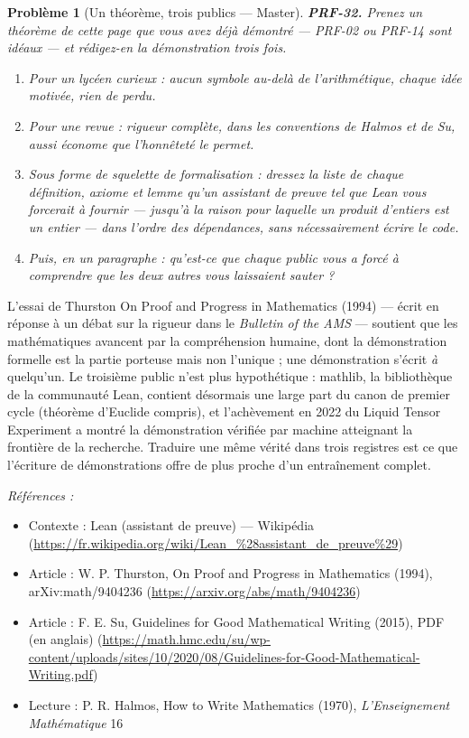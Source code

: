 \documentclass[11pt]{article}
\newtheorem{problem}{Problème}
\newenvironment{refs}{\par\small\noindent\emph{Références :}\begin{itemize}\setlength\itemsep{0pt}}{\end{itemize}\normalsize}
\begin{document}
\bigskip

\begin{problem}[{Un théorème, trois publics --- Master}]
\textbf{PRF-32.} Prenez un théorème de cette page que vous avez déjà démontré ---
PRF-02 ou PRF-14 sont idéaux --- et rédigez-en la démonstration trois fois.
\begin{enumerate}
\item[(a)] Pour un lycéen
curieux : aucun symbole au-delà de l'arithmétique, chaque idée motivée, rien de perdu.
\item[(b)] Pour une revue : rigueur complète, dans les conventions de Halmos et de Su, aussi
économe que l'honnêteté le permet.
\item[(c)] Sous forme de squelette de formalisation : dressez la liste de chaque définition,
axiome et lemme qu'un assistant de preuve tel que Lean vous forcerait à fournir --- jusqu'à
la raison pour laquelle un produit d'entiers est un entier --- dans l'ordre des dépendances,
sans nécessairement écrire le code.
\item[(d)] Puis, en un paragraphe : qu'est-ce que chaque public vous a forcé à comprendre que les
deux autres vous laissaient sauter ?
\end{enumerate}

\end{problem}

\noindent L'essai de Thurston \og{} On Proof and Progress in Mathematics \fg{} (1994) ---
écrit en réponse à un débat sur la rigueur dans le \textit{Bulletin of the AMS} --- soutient que
les mathématiques avancent par la compréhension humaine, dont la démonstration formelle est
la partie porteuse mais non l'unique ; une démonstration s'écrit \textit{à} quelqu'un. Le
troisième public n'est plus hypothétique : mathlib, la bibliothèque de la communauté Lean,
contient désormais une large part du canon de premier cycle (théorème d'Euclide compris), et
l'achèvement en 2022 du Liquid Tensor Experiment a montré la démonstration vérifiée par
machine atteignant la frontière de la recherche. Traduire une même vérité dans trois
registres est ce que l'écriture de démonstrations offre de plus proche d'un entraînement
complet.

\begin{refs}
\item Contexte : Lean (assistant de preuve) --- Wikipédia (\url{https://fr.wikipedia.org/wiki/Lean_%28assistant_de_preuve%29})
\item Article : W. P. Thurston, \og{} On Proof and Progress in Mathematics \fg{} (1994), arXiv:math/9404236 (\url{https://arxiv.org/abs/math/9404236})
\item Article : F. E. Su, \og{} Guidelines for Good Mathematical Writing \fg{} (2015), PDF (en anglais) (\url{https://math.hmc.edu/su/wp-content/uploads/sites/10/2020/08/Guidelines-for-Good-Mathematical-Writing.pdf})
\item Lecture : P. R. Halmos, \og{} How to Write Mathematics \fg{} (1970), \textit{L'Enseignement Mathématique} 16
\end{refs}
\end{document}
